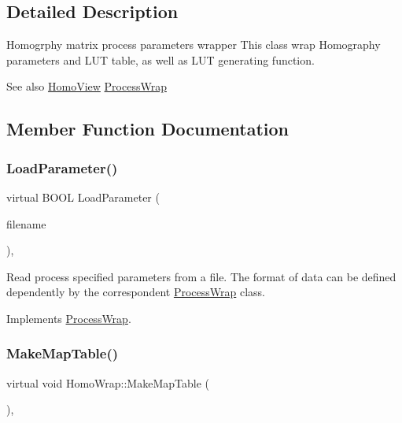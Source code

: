 \subsection{Detailed Description}
Homogrphy matrix process parameters wrapper This class wrap Homography parameters and L\+UT table, as well as L\+UT generating function. 

\begin{DoxySeeAlso}{See also}
\mbox{\hyperlink{class_homo_view}{Homo\+View}} \mbox{\hyperlink{class_process_wrap}{Process\+Wrap}} 
\end{DoxySeeAlso}


\subsection{Member Function Documentation}
\mbox{\label{class_homo_wrap_a5409cdfe65bc28ec3779f35eb3af22b4}} 
\subsubsection{\texorpdfstring{Load\+Parameter()}{LoadParameter()}}
{\footnotesize\ttfamily virtual B\+O\+OL Load\+Parameter (\begin{DoxyParamCaption}\item[{L\+P\+C\+T\+S\+TR}]{filename }\end{DoxyParamCaption})\hspace{0.3cm}{\ttfamily [inline]}, {\ttfamily [virtual]}}

Read process specified parameters from a file. The format of data can be defined dependently by the correspondent \mbox{\hyperlink{class_process_wrap}{Process\+Wrap}} class. 

Implements \mbox{\hyperlink{class_process_wrap_a1cb75a423ff8f5ef736fc00a34792493}{Process\+Wrap}}.

\mbox{\label{class_homo_wrap_a04c5506434d9afe322bfd6c08c51868f}} 
\subsubsection{\texorpdfstring{Make\+Map\+Table()}{MakeMapTable()}}
{\footnotesize\ttfamily virtual void Homo\+Wrap\+::\+Make\+Map\+Table (\begin{DoxyParamCaption}{ }\end{DoxyParamCaption})\hspace{0.3cm}{\ttfamily [inline]}, {\ttfamily [virtual]}}

